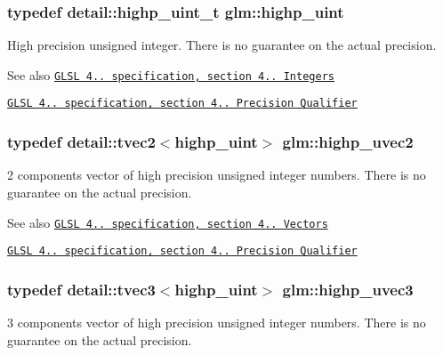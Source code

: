 \subsubsection[{highp\+\_\+uint}]{\setlength{\rightskip}{0pt plus 5cm}typedef detail\+::highp\+\_\+uint\+\_\+t {\bf glm\+::highp\+\_\+uint}}\label{group__core__precision_gabfd1cf11193324a5f77d3831b6ac3205}
High precision unsigned integer. There is no guarantee on the actual precision.

\begin{DoxySeeAlso}{See also}
\href{http://www.opengl.org/registry/doc/GLSLangSpec.4.20.8.pdf}{\tt G\+L\+S\+L 4.. specification, section 4.. Integers} 

\href{http://www.opengl.org/registry/doc/GLSLangSpec.4.20.8.pdf}{\tt G\+L\+S\+L 4.. specification, section 4.. Precision Qualifier} 
\end{DoxySeeAlso}
\hypertarget{group__core__precision_ga1c56d043a20a6db84fc3d18b227875fb}{}
\subsubsection[{highp\+\_\+uvec2}]{\setlength{\rightskip}{0pt plus 5cm}typedef detail\+::tvec2$<$highp\+\_\+uint$>$ {\bf glm\+::highp\+\_\+uvec2}}\label{group__core__precision_ga1c56d043a20a6db84fc3d18b227875fb}
2 components vector of high precision unsigned integer numbers. There is no guarantee on the actual precision.

\begin{DoxySeeAlso}{See also}
\href{http://www.opengl.org/registry/doc/GLSLangSpec.4.20.8.pdf}{\tt G\+L\+S\+L 4.. specification, section 4.. Vectors} 

\href{http://www.opengl.org/registry/doc/GLSLangSpec.4.20.8.pdf}{\tt G\+L\+S\+L 4.. specification, section 4.. Precision Qualifier} 
\end{DoxySeeAlso}
\hypertarget{group__core__precision_gade4b43d968dd42ee3215a51de7b86425}{}
\subsubsection[{highp\+\_\+uvec3}]{\setlength{\rightskip}{0pt plus 5cm}typedef detail\+::tvec3$<$highp\+\_\+uint$>$ {\bf glm\+::highp\+\_\+uvec3}}\label{group__core__precision_gade4b43d968dd42ee3215a51de7b86425}
3 components vector of high precision unsigned integer numbers. There is no guarantee on the actual precision.

